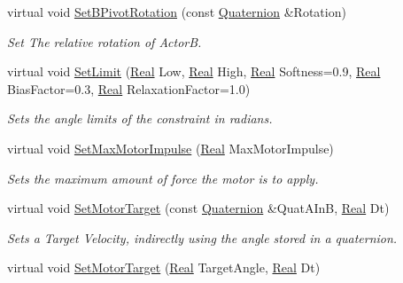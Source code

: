 \begin{DoxyCompactItemize}
virtual void \hyperlink{classMezzanine_1_1HingeConstraint_a99f32e38d0df3bdfb266f36b83f4f1f6}{SetBPivotRotation} (const \hyperlink{classMezzanine_1_1Quaternion}{Quaternion} \&Rotation)
\begin{DoxyCompactList}\small\item\em Set The relative rotation of ActorB. \item\end{DoxyCompactList}\item 
virtual void \hyperlink{classMezzanine_1_1HingeConstraint_ac6d39a9c3da1aa6611507fdcf9b9e901}{SetLimit} (\hyperlink{namespaceMezzanine_a726731b1a7df72bf3583e4a97282c6f6}{Real} Low, \hyperlink{namespaceMezzanine_a726731b1a7df72bf3583e4a97282c6f6}{Real} High, \hyperlink{namespaceMezzanine_a726731b1a7df72bf3583e4a97282c6f6}{Real} Softness=0.9, \hyperlink{namespaceMezzanine_a726731b1a7df72bf3583e4a97282c6f6}{Real} BiasFactor=0.3, \hyperlink{namespaceMezzanine_a726731b1a7df72bf3583e4a97282c6f6}{Real} RelaxationFactor=1.0)
\begin{DoxyCompactList}\small\item\em Sets the angle limits of the constraint in radians. \item\end{DoxyCompactList}\item 
virtual void \hyperlink{classMezzanine_1_1HingeConstraint_aa2f0a760f84f7682feb6d8564256e644}{SetMaxMotorImpulse} (\hyperlink{namespaceMezzanine_a726731b1a7df72bf3583e4a97282c6f6}{Real} MaxMotorImpulse)
\begin{DoxyCompactList}\small\item\em Sets the maximum amount of force the motor is to apply. \item\end{DoxyCompactList}\item 
virtual void \hyperlink{classMezzanine_1_1HingeConstraint_a7d195f18c2fbe6f458c4af94320c923c}{SetMotorTarget} (const \hyperlink{classMezzanine_1_1Quaternion}{Quaternion} \&QuatAInB, \hyperlink{namespaceMezzanine_a726731b1a7df72bf3583e4a97282c6f6}{Real} Dt)
\begin{DoxyCompactList}\small\item\em Sets a Target Velocity, indirectly using the angle stored in a quaternion. \item\end{DoxyCompactList}\item 
virtual void \hyperlink{classMezzanine_1_1HingeConstraint_ab6ec259478024f5fedc055563cf15ee6}{SetMotorTarget} (\hyperlink{namespaceMezzanine_a726731b1a7df72bf3583e4a97282c6f6}{Real} TargetAngle, \hyperlink{namespaceMezzanine_a726731b1a7df72bf3583e4a97282c6f6}{Real} Dt)

\end{DoxyCompactItemize}
